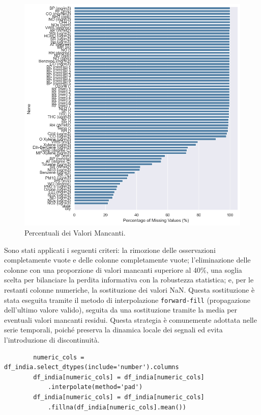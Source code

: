 \documentclass[a4paper,12pt]{report}
\begin{document}
	\begin{figure}[H]
		\centering
		\includegraphics[width=1.0\textwidth]{img/miss_value_pm.png}
		\caption{Percentuali dei Valori Mancanti.}
	\end{figure}
	
	Sono stati applicati i seguenti criteri: la rimozione delle osservazioni completamente vuote e delle colonne completamente vuote; l'eliminazione delle colonne con una proporzione di valori mancanti superiore al 40\%, una soglia scelta per bilanciare la perdita informativa con la robustezza statistica; e, per le restanti colonne numeriche, la sostituzione dei valori NaN. Questa sostituzione è stata eseguita tramite il metodo di interpolazione \texttt{forward-fill} (propagazione dell'ultimo valore valido), seguita da una sostituzione tramite la media per eventuali valori mancanti residui. Questa strategia è comunemente adottata nelle serie temporali, poiché preserva la dinamica locale dei segnali ed evita l'introduzione di discontinuità.
	
	\begin{verbatim}
		numeric_cols = df_india.select_dtypes(include='number').columns
		df_india[numeric_cols] = df_india[numeric_cols]
			.interpolate(method='pad')
		df_india[numeric_cols] = df_india[numeric_cols]
			.fillna(df_india[numeric_cols].mean())
	\end{verbatim}
	
\end{document}
